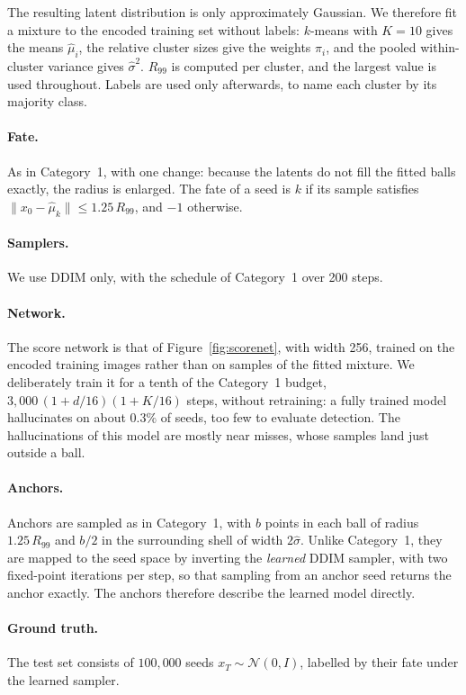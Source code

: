\documentclass[11pt]{article}
\begin{document}
The resulting latent distribution is only approximately Gaussian. We therefore fit a mixture to
the encoded training set without labels: $k$-means with $K = 10$ gives the means $\hat\mu_i$, the
relative cluster sizes give the weights $\hat\pi_i$, and the pooled within-cluster variance gives
$\hat\sigma^2$. $R_{99}$ is computed per cluster, and the largest value is used throughout. Labels
are used only afterwards, to name each cluster by its majority class.

\paragraph{Fate.}
As in Category~1, with one change: because the latents do not fill the fitted balls exactly, the
radius is enlarged. The fate of a seed is $k$ if its sample satisfies
$\|x_0 - \hat\mu_k\| \le 1.25\,R_{99}$, and $-1$ otherwise.

\paragraph{Samplers.}
We use DDIM only, with the schedule of Category~1 over 200 steps.

\paragraph{Network.}
The score network is that of Figure~\ref{fig:scorenet}, with width 256, trained on the encoded
training images rather than on samples of the fitted mixture. We deliberately train it for a
tenth of the Category~1 budget, $3{,}000\,(1 + d/16)(1 + K/16)$ steps, without retraining: a fully
trained model hallucinates on about $0.3\%$ of seeds, too few to evaluate detection. The
hallucinations of this model are mostly near misses, whose samples land just outside a ball.

\paragraph{Anchors.}
Anchors are sampled as in Category~1, with $b$ points in each ball of radius $1.25\,R_{99}$ and
$b/2$ in the surrounding shell of width $2\hat\sigma$. Unlike Category~1, they are mapped to the
seed space by inverting the \emph{learned} DDIM sampler, with two fixed-point iterations per step,
so that sampling from an anchor seed returns the anchor exactly. The anchors therefore describe
the learned model directly.

\paragraph{Ground truth.}
The test set consists of $100{,}000$ seeds $x_T \sim \mathcal{N}(0, I)$, labelled by their fate
under the learned sampler.
\end{document}
